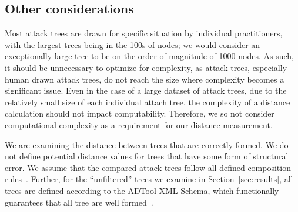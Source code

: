 












% 



\subsection{Other considerations}

Most attack trees are drawn for specific situation by individual practitioners, with the largest trees being in the 100s of nodes; we would consider an exceptionally large tree to be on the order of magnitude of 1000 nodes. As such, it should be unnecessary to optimize for complexity, as attack trees, especially human drawn attack trees, do not reach the size where complexity becomes a significant issue. Even in the case of a large dataset of attack trees, due to the relatively small size of each individual attach tree, the complexity of a distance calculation should not impact computability. Therefore, we so not consider computational complexity as a requirement for our distance measurement.

We are examining the distance between trees that are correctly formed. We do not define potential distance values for trees that have some form of structural error. We assume that the compared attack trees follow all defined composition rules~\cite{mauw_foundations_2006}. Further, for the ``unfiltered'' trees we examine in Section~\ref{sec:results}, all trees are defined according to the ADTool XML Schema, which functionally guarantees that all tree are well formed~\cite{kordy_adtool_2013}.



















